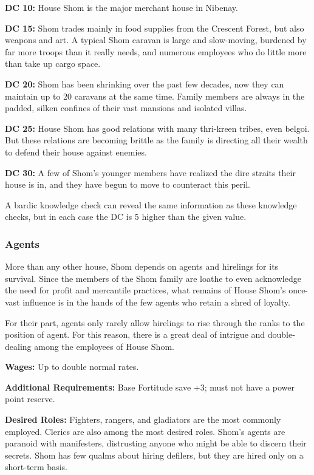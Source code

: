 \textbf{DC 10:} House Shom is the major merchant house in Nibenay.

\textbf{DC 15:} Shom trades mainly in food supplies from the Crescent Forest, but also weapons and art. A typical Shom caravan is large and slow-moving, burdened by far more troops than it really needs, and numerous employees who do little more than take up cargo space.

\textbf{DC 20:} Shom has been shrinking over the past few decades, now they can maintain up to 20 caravans at the same time. Family members are always in the padded, silken confines of their vast mansions and isolated villas.

\textbf{DC 25:} House Shom has good relations with many thri-kreen tribes, even belgoi. But these relations are becoming brittle as the family is directing all their wealth to defend their house against enemies.

\textbf{DC 30:} A few of Shom's younger members have realized the dire straits their house is in, and they have begun to move to counteract this peril.

A bardic knowledge check can reveal the same information as these knowledge checks, but in each case the DC is 5 higher than the given value.

\subsubsection{Agents}
More than any other house, Shom depends on agents and hirelings for its survival. Since the members of the Shom family are loathe to even acknowledge the need for profit and mercantile practices, what remains of House Shom's once-vast influence is in the hands of the few agents who retain a shred of loyalty.

For their part, agents only rarely allow hirelings to rise through the ranks to the position of agent. For this reason, there is a great deal of intrigue and double-dealing among the employees of House Shom.

\textbf{Wages:} Up to double normal rates.

\textbf{Additional Requirements:} Base Fortitude save +3; must not have a power point reserve.

\textbf{Desired Roles:} Fighters, rangers, and gladiators are the most commonly employed. Clerics are also among the most desired roles. Shom's agents are paranoid with manifesters, distrusting anyone who might be able to discern their secrets. Shom has few qualms about hiring defilers, but they are hired only on a short-term basis.